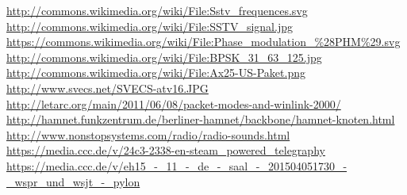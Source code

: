 \begin{thebibliography}{}
                    \url{http://commons.wikimedia.org/wiki/File:Sstv_frequences.svg}\\
                    \url{http://commons.wikimedia.org/wiki/File:SSTV_signal.jpg}\\
                    \url{https://commons.wikimedia.org/wiki/File:Phase_modulation_\%28PHM\%29.svg}\\
                    \url{http://commons.wikimedia.org/wiki/File:BPSK_31_63_125.jpg}\\
                    \url{http://commons.wikimedia.org/wiki/File:Ax25-US-Paket.png}
       \url{http://www.svecs.net/SVECS-atv16.JPG}
      \url{http://letarc.org/main/2011/06/08/packet-modes-and-winlink-2000/}
    \url{http://hamnet.funkzentrum.de/berliner-hamnet/backbone/hamnet-knoten.html}
       \url{http://www.nonstopsystems.com/radio/radio-sounds.html}
     \url{https://media.ccc.de/v/24c3-2338-en-steam_powered_telegraphy}
      \url{https://media.ccc.de/v/eh15_-_11_-_de_-_saal_-_201504051730_-_wspr_und_wsjt_-_pylon}
\end{thebibliography} 


